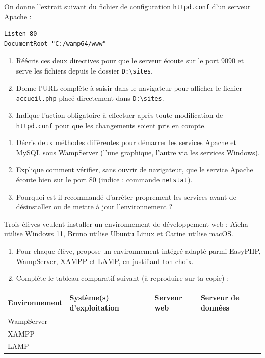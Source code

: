 \documentclass[11pt]{article}
\begin{document}
\begin{exercice}
On donne l'extrait suivant du fichier de configuration \texttt{httpd.conf} d'un serveur Apache :
\begin{lstlisting}
Listen 80
DocumentRoot "C:/wamp64/www"
\end{lstlisting}
\begin{enumerate}
\item Réécris ces deux directives pour que le serveur écoute sur le port 9090 et serve les fichiers depuis le dossier \texttt{D:\textbackslash sites}.
\item Donne l'URL complète à saisir dans le navigateur pour afficher le fichier \texttt{accueil.php} placé directement dans \texttt{D:\textbackslash sites}.
\item Indique l'action obligatoire à effectuer après toute modification de \texttt{httpd.conf} pour que les changements soient pris en compte.
\end{enumerate}
\end{exercice}

\begin{exercice}
\begin{enumerate}
\item Décris deux méthodes différentes pour démarrer les services Apache et MySQL sous WampServer (l'une graphique, l'autre via les services Windows).
\item Explique comment vérifier, sans ouvrir de navigateur, que le service Apache écoute bien sur le port 80 (indice : commande \texttt{netstat}).
\item Pourquoi est-il recommandé d'arrêter proprement les services avant de désinstaller ou de mettre à jour l'environnement ?
\end{enumerate}
\end{exercice}

\begin{exercice}
Trois élèves veulent installer un environnement de développement web : Aïcha utilise Windows 11, Bruno utilise Ubuntu Linux et Carine utilise macOS.
\begin{enumerate}
\item Pour chaque élève, propose un environnement intégré adapté parmi EasyPHP, WampServer, XAMPP et LAMP, en justifiant ton choix.
\item Complète le tableau comparatif suivant (à reproduire sur ta copie) :
\end{enumerate}
\begin{center}
\begin{tabularx}{\linewidth}{|l|X|X|X|}
\hline
\rowcolor{popblueL} \textbf{Environnement} & \textbf{Système(s) d'exploitation} & \textbf{Serveur web} & \textbf{Serveur de données} \\
\hline
WampServer & & & \\
\hline
XAMPP & & & \\
\hline
LAMP & & & \\
\hline
\end{tabularx}
\end{center}
\end{exercice}
\end{document}
